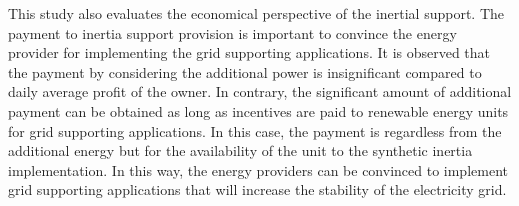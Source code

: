 This study also evaluates the economical perspective of the inertial support. The payment to inertia support provision is important to convince the energy provider for implementing the grid supporting applications. It is observed that the payment by considering the additional power is insignificant compared to daily average profit of the owner. In contrary, the significant amount of additional payment can be obtained as long as incentives are paid to renewable energy units for grid supporting applications. In this case, the payment is regardless from the additional energy but for the availability of the unit to the synthetic inertia implementation. In this way, the energy providers can be convinced to implement grid supporting applications that will increase the stability of the electricity grid.